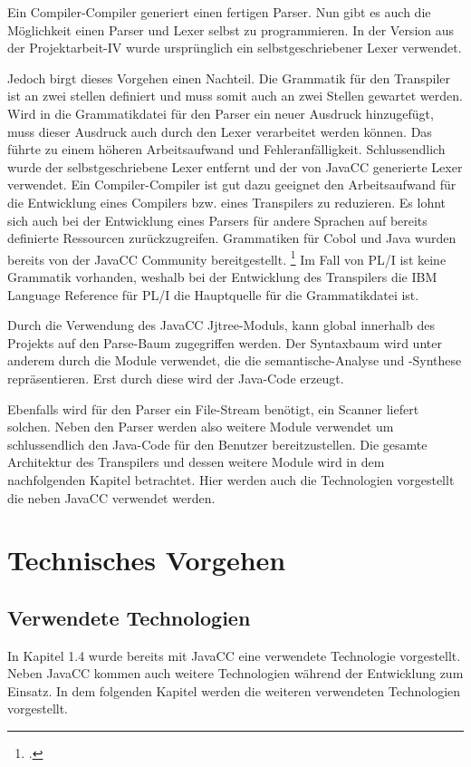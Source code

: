 
Ein Compiler-Compiler generiert einen fertigen Parser. Nun gibt es auch die Möglichkeit einen Parser und Lexer selbst zu programmieren. In der Version aus der Projektarbeit-IV wurde ursprünglich ein selbstgeschriebener Lexer verwendet.

Jedoch birgt dieses Vorgehen einen Nachteil. Die Grammatik für den Transpiler ist an zwei stellen definiert und muss somit auch an zwei Stellen gewartet werden.
Wird in die Grammatikdatei für den Parser ein neuer Ausdruck hinzugefügt, muss dieser Ausdruck auch durch den Lexer verarbeitet werden können.
Das führte zu einem höheren Arbeitsaufwand und Fehleranfälligkeit. Schlussendlich wurde der selbstgeschriebene Lexer entfernt und der von JavaCC generierte Lexer verwendet.
Ein Compiler-Compiler ist gut dazu geeignet den Arbeitsaufwand für die Entwicklung eines Compilers bzw. eines Transpilers zu reduzieren. 
Es lohnt sich auch bei der Entwicklung eines Parsers für andere Sprachen auf bereits definierte Ressourcen zurückzugreifen. 
Grammatiken für Cobol und Java wurden bereits von der JavaCC Community bereitgestellt. \footcite[Vgl. ][]{javaccdoku}
Im Fall von PL/I ist keine Grammatik vorhanden, weshalb bei der Entwicklung des Transpilers die IBM Language Reference für PL/I die Hauptquelle für die Grammatikdatei ist.   

Durch die Verwendung des JavaCC Jjtree-Moduls, kann global innerhalb des Projekts auf den Parse-Baum zugegriffen werden. 
Der Syntaxbaum wird unter anderem durch die Module verwendet, die die semantische-Analyse und -Synthese repräsentieren.
Erst durch diese wird der Java-Code erzeugt.

Ebenfalls wird für den Parser ein File-Stream benötigt, ein Scanner liefert solchen.
Neben den Parser werden also weitere Module verwendet um schlussendlich den Java-Code für den Benutzer bereitzustellen.
Die gesamte Architektur des Transpilers und dessen weitere Module wird in dem nachfolgenden Kapitel betrachtet. 
Hier werden auch die Technologien vorgestellt die neben JavaCC verwendet werden. 

\section{Technisches Vorgehen}
\subsection{Verwendete Technologien}
In Kapitel 1.4 wurde bereits mit JavaCC eine verwendete Technologie vorgestellt. Neben JavaCC kommen auch weitere Technologien während der Entwicklung zum Einsatz. In dem folgenden Kapitel werden die weiteren verwendeten Technologien vorgestellt.

